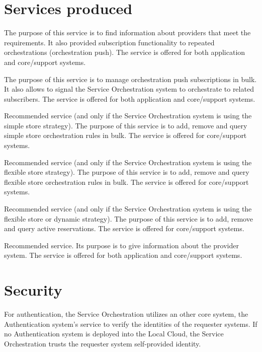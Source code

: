 \documentclass[a4paper]{arrowhead}
\begin{document}
\newpage

\section{Services produced}
\label{sec:services}

The purpose of this service is to find information about providers that meet the requirements. It also provided subscription functionality to repeated orchestrations (orchestration push). The service is offered for both application and core/support systems. 

The purpose of this service is to manage orchestration push subscriptions in bulk. It also allows to signal the Service Orchestration system to orchestrate to related subscribers. The service is offered for both application and core/support systems. 

Recommended service (and only if the Service Orchestration system is using the simple store strategy). The purpose of this service is to add, remove and query simple store orchestration rules in bulk. The service is offered for core/support systems.

Recommended service (and only if the Service Orchestration system is using the flexible store strategy). The purpose of this service is to add, remove and query flexible store orchestration rules in bulk. The service is offered for core/support systems.

Recommended service (and only if the Service Orchestration system is using the flexible store or dynamic strategy). The purpose of this service is to add, remove and query active reservations. The service is offered for core/support systems.

Recommended service. Its purpose is to give information about the provider system. The service is offered for both application and core/support systems. 

\newpage

\section{Security}
\label{sec:security}

For authentication, the Service Orchestration utilizes an other core system, the Authentication system's service to verify the identities of the requester systems. If no Authentication system is deployed into the Local Cloud, the Service Orchestration trusts the requester system self-provided identity.
\end{document}
